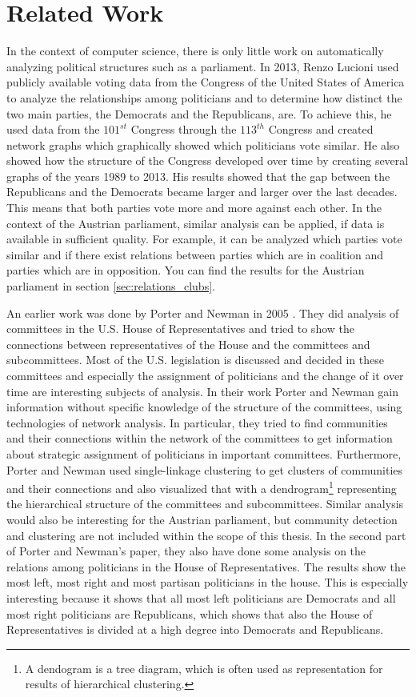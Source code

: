 \chapter{Related Work}
\label{chap:relatedwork}

In the context of computer science, there is only little work on automatically analyzing political structures such as a parliament. In 2013, Renzo Lucioni \cite{Lucioni_2015} used publicly available voting data from the Congress of the United States of America to analyze the relationships among politicians and to determine how distinct the two main parties, the Democrats and the Republicans, are. To achieve this, he used data from the $101^{st}$ Congress through the $113^{th}$ Congress and created network graphs which graphically showed which politicians vote similar. He also showed how the structure of the Congress developed over time by creating several graphs of the years 1989 to 2013. His results showed that the gap between the Republicans and the Democrats became larger and larger over the last decades. This means that both parties vote more and more against each other. In the context of the Austrian parliament, similar analysis can be applied, if data is available in sufficient quality. For example, it can be analyzed which parties vote similar and if there exist relations between parties which are in coalition and parties which are in opposition. You can find the results for the Austrian parliament in section \ref{sec:relations_clubs}.

An earlier work was done by Porter and Newman in 2005 \cite{Porter_2005}. They did analysis of committees in the U.S. House of Representatives and tried to show the connections between representatives of the House and the committees and subcommittees. Most of the U.S. legislation is discussed and decided in these committees and especially the assignment of politicians and the change of it over time are interesting subjects of analysis. In their work Porter and Newman gain information without specific knowledge of the structure of the committees, using technologies of network analysis. In particular, they tried to find communities and their connections within the network of the committees to get information about strategic assignment of politicians in important committees. Furthermore, Porter and Newman used single-linkage clustering to get clusters of communities and their connections and also visualized that with a dendrogram\footnote{A dendogram is a tree diagram, which is often used as representation for results of hierarchical clustering.} representing the hierarchical structure of the committees and subcommittees. Similar analysis would also be interesting for the Austrian parliament, but community detection and clustering are not included within the scope of this thesis. In the second part of Porter and Newman's paper, they also have done some analysis on the relations among politicians in the House of Representatives. The results show the most left, most right and most partisan politicians in the house. This is especially interesting because it shows that all most left politicians are Democrats and all most right politicians are Republicans, which shows that also the House of Representatives is divided at a high degree into Democrats and Republicans.

